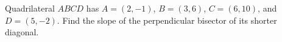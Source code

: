 Quadrilateral $ABCD$ has $A=(2,-1)$, $B=(3,6)$, $C=(6,10)$, and $D=(5,-2)$. Find the slope of the perpendicular bisector of its shorter diagonal.
